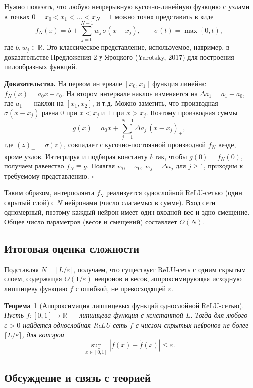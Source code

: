 \documentclass[12pt]{article}
\newtheorem{theorem}{Теорема}
\begin{document}
	Нужно показать, что любую непрерывную кусочно-линейную функцию с узлами в точках $0=x_0<x_1<\dots<x_N=1$ можно точно представить в виде
	\[
	f_N(x) = b + \sum_{j=0}^{N-1} w_j\,\sigma(x-x_j),\qquad \sigma(t)=\max(0,t),
	\]
	где $b,w_j\in\mathbb{R}$. Это классическое представление, используемое, например, в доказательстве Предложения 2 у Яроцкого (Yarotsky, 2017) для построения пилообразных функций.
	
	\textbf{Доказательство.} На первом интервале $[x_0,x_1]$ функция линейна: $f_N(x)=a_0x+c_0$. На втором интервале наклон изменяется на $\Delta a_1 = a_1-a_0$, где $a_1$ --- наклон на $[x_1,x_2]$, и т.д. Можно заметить, что производная $\sigma(x-x_j)$ равна $0$ при $x<x_j$ и $1$ при $x>x_j$. Поэтому производная суммы
	\[
	g(x)=a_0x + \sum_{j=1}^{N-1} \Delta a_j\,(x-x_j)_+,
	\]
	где $(z)_+=\sigma(z)$, совпадает с кусочно-постоянной производной $f_N$ везде, кроме узлов. Интегрируя и подбирая константу $b$ так, чтобы $g(0)=f_N(0)$, получаем равенство $f_N\equiv g$. Полагая $w_0=a_0$, $w_j=\Delta a_j$ для $j\ge1$, приходим к требуемому представлению. $\square$
	
	Таким образом, интерполянта $f_N$ реализуется однослойной ReLU-сетью (один скрытый слой) с $N$ нейронами (число слагаемых в сумме). Вход сети одномерный, поэтому каждый нейрон имеет один входной вес и одно смещение. Общее число параметров (весов и смещений) составляет $O(N)$.
	
	\subsection{Итоговая оценка сложности}
	
	Подставляя $N=\lceil L/\varepsilon\rceil$, получаем, что существует ReLU-сеть с одним скрытым слоем, содержащая $O(1/\varepsilon)$ нейронов и весов, аппроксимирующая исходную липшицеву функцию $f$ с ошибкой, не превосходящей $\varepsilon$.
	
	\begin{theorem}[Аппроксимация липшицевых функций однослойной ReLU-сетью]
		Пусть $f:[0,1]\to\mathbb{R}$ --- липшицева функция с константой $L$. Тогда для любого $\varepsilon>0$ найдется однослойная ReLU-сеть $\widetilde{f}$ с числом скрытых нейронов не более $\lceil L/\varepsilon\rceil$, для которой
		\[
		\sup_{x\in[0,1]}|f(x)-\widetilde{f}(x)|\le\varepsilon.
		\]
	\end{theorem}
	
	\subsection{Обсуждение и связь с теорией}
	
\end{document}
